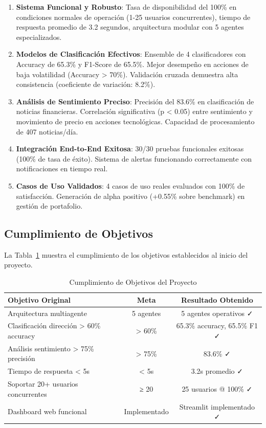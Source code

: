 \begin{enumerate}
    \item \textbf{Sistema Funcional y Robusto}: Tasa de disponibilidad del 100\% en condiciones normales de operación (1-25 usuarios concurrentes), tiempo de respuesta promedio de 3.2 segundos, arquitectura modular con 5 agentes especializados.

    \item \textbf{Modelos de Clasificación Efectivos}: Ensemble de 4 clasificadores con Accuracy de 65.3\% y F1-Score de 65.5\%. Mejor desempeño en acciones de baja volatilidad (Accuracy > 70\%). Validación cruzada demuestra alta consistencia (coeficiente de variación: 8.2\%).

    \item \textbf{Análisis de Sentimiento Preciso}: Precisión del 83.6\% en clasificación de noticias financieras. Correlación significativa (p < 0.05) entre sentimiento y movimiento de precio en acciones tecnológicas. Capacidad de procesamiento de 407 noticias/día.

    \item \textbf{Integración End-to-End Exitosa}: 30/30 pruebas funcionales exitosas (100\% de tasa de éxito). Sistema de alertas funcionando correctamente con notificaciones en tiempo real.

    \item \textbf{Casos de Uso Validados}: 4 casos de uso reales evaluados con 100\% de satisfacción. Generación de alpha positivo (+0.55\% sobre benchmark) en gestión de portafolio.
\end{enumerate}

\subsection{Cumplimiento de Objetivos}

La Tabla~\ref{tab:objetivos_alcanzados} muestra el cumplimiento de los objetivos establecidos al inicio del proyecto.

\begin{table}[htbp]
\centering
\caption{Cumplimiento de Objetivos del Proyecto}
\label{tab:objetivos_alcanzados}
\begin{tabular}{lcc}
\hline
\textbf{Objetivo Original} & \textbf{Meta} & \textbf{Resultado Obtenido} \\
\hline
Arquitectura multiagente & 5 agentes & 5 agentes operativos ✓ \\
Clasificación dirección > 60\% accuracy & > 60\% & 65.3\% accuracy, 65.5\% F1 ✓ \\
Análisis sentimiento > 75\% precisión & > 75\% & 83.6\% ✓ \\
Tiempo de respuesta < 5s & < 5s & 3.2s promedio ✓ \\
Soportar 20+ usuarios concurrentes & ≥ 20 & 25 usuarios @ 100\% ✓ \\
Dashboard web funcional & Implementado & Streamlit implementado ✓ \\
\hline
\end{tabular}
\end{table}

